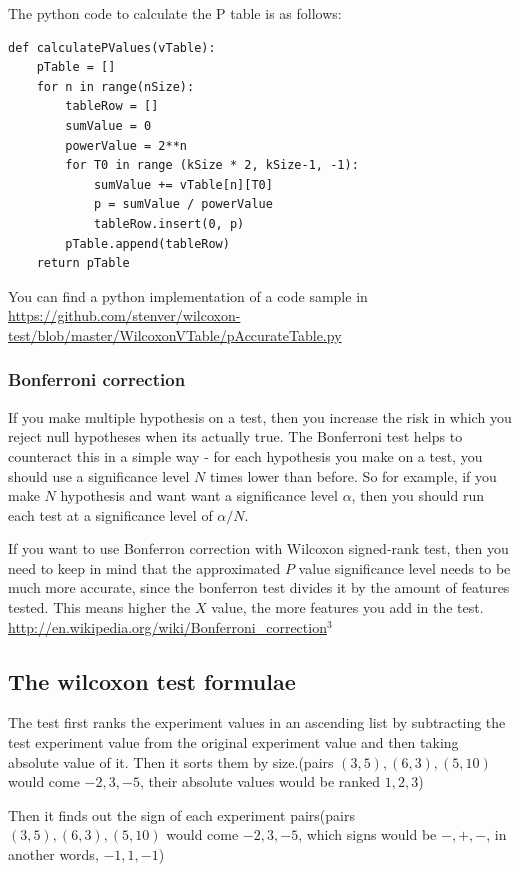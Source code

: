 \documentclass[12pt]{article}
\begin{document}
The python code to calculate the P table is as follows:

\begin{verbatim}
def calculatePValues(vTable):
    pTable = []
    for n in range(nSize):
        tableRow = []
        sumValue = 0
        powerValue = 2**n
        for T0 in range (kSize * 2, kSize-1, -1):
            sumValue += vTable[n][T0]
            p = sumValue / powerValue
            tableRow.insert(0, p)
        pTable.append(tableRow)
    return pTable

\end{verbatim}

You can find a python implementation of a code sample in
\url{https://github.com/stenver/wilcoxon-test/blob/master/WilcoxonVTable/pAccurateTable.py}

\subsubsection{Bonferroni correction}

If you make multiple hypothesis on a test, then you increase the risk in which you reject null hypotheses when its actually true. The Bonferroni test helps to counteract this in a simple way - for each hypothesis you make on a test, you should use a significance level $N$ times lower than before. So for example, if you make $N$ hypothesis and want want a significance level $α$,  then you should run each test at a significance level of $α/N$.

If you want to use Bonferron correction with Wilcoxon signed-rank test, then you need to keep in mind that the approximated $P$ value significance level needs to be much more accurate, since the bonferron test divides it by the amount of features tested. This means higher the $X$ value, the more features you add in the test. \url{http://en.wikipedia.org/wiki/Bonferroni_correction}$^3$

\subsection{The wilcoxon test formulae}

The test first ranks the experiment values in an ascending list by subtracting the test experiment value from the original experiment value and then taking absolute value of it. Then it sorts them by size.(pairs $(3, 5), (6, 3), (5, 10)$ would come $-2, 3, -5$, their absolute values would be ranked $1, 2, 3$)

Then it finds out the sign of each experiment pairs(pairs $(3, 5), (6, 3), (5, 10)$ would come $-2, 3, -5$, which signs would be $-, +, -$, in another words, $-1, 1, -1$)
\end{document}
